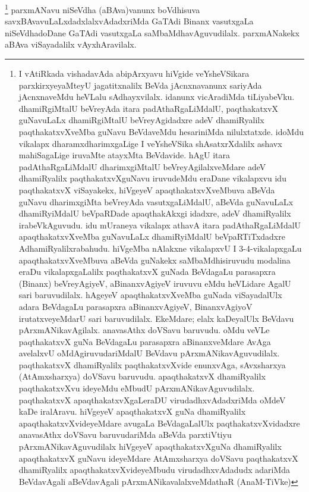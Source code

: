 \begin{artha}
\footnote{I vAtiRkada vishadavAda abipArxyavu hiVgide veYsheVSikara parxkirxyeyaMteyU jagatitxnalilx BeVda jAcnxnavanunx sariyAda jAcnxnaveMdu heVLalu sAdhayxvilalx. idanunx vicAradiMda tiLiyabeVku. dhamiRgiMtalU beVreyAda itara padAthaRgaLiMdalU, paqthakatxvX guNavuLaLx dhamiRgiMtalU beVreyAgidadxre adeV dhamiRyalilx paqthakatxvXveMba guNavu BeVdaveMdu hesariniMda nilulxtatxde. idoMdu vikalapx dharamxdharimxgaLige I veYsheVSika shAsatxrXdalilx ashavx mahiSagaLige iruvaMte atayxMta BeVdavide. hAgU itara padAthaRgaLiMdalU dharimxgiMtalU beVreyAgilalxveMdare adeV dhamiRyalilx paqthakatxvXguNavu iruvudeMdu eraDane vikalapxvu idu paqthakatxvX viSayakekx, hiVgeyeV apaqthakatxvXveMbuva aBeVda guNavu dharimxgiMta beVreyAda vasutxgaLiMdalU, aBeVda guNavuLaLx dhamiRyiMdalU beVpaRDade apaqthakAkxgi idadxre, adeV dhamiRyalilx irabeVkAguvudu. idu mUraneya vikalapx athavA itara padAthaRgaLiMdalU apaqthakatxvXveMba guNavuLaLx dhamiRyiMdalU beVpaRTiTxdadxre AdhamiRyalilxrabahudu. hiVgeMba nAlakxne vikalapxvU I 3-4-vikalapxgaLu apaqthakatxvXveMbuva aBeVda guNakekx saMbaMdhisiruvudu modalina eraDu vikalapxgaLalilx paqthakatxvX guNada BeVdagaLu parasapxra (Binanx) beVreyAgiyeV, aBinanxvAgiyeV iruvuvu eMdu heVLidare AgalU sari baruvudilalx. hAgeyeV apaqthakatxvXveMba guNada viSayadalUlx adara BeVdagaLu parasapxra aBinanxvAgiyeV, BinanxvAgiyoV irutatxveyeMdarU sari baruvudilalx. EkeMdare; elalx kaDeyalUlx BeVdavu pArxmANikavAgilalx. anavasAthx doVSavu baruvudu. oMdu veVLe paqthakatxvX guNa BeVdagaLu parasapxra aBinanxveMdare AvAga avelalxvU oMdAgiruvudariMdalU BeVdavu pArxmANikavAguvudilalx. paqthakatxvX dhamiRyalilx paqthakatxvXvide enunxvAga, sAvxsharxya (AtAmxsharxya) doVSavu baruvudu. apaqthakatxvX dhamiRyalilx paqthakatxvXvu ideyeMdu eMbudU pArxmANikavAguvudilalx. paqthakatxvX apaqthakatxvXgaLeraDU virudadhxvAdadxriMda oMdeV kaDe iralAravu. hiVgeyeV apaqthakatxvX guNa dhamiRyalilx apaqthakatxvXvideyeMdare avugaLa BeVdagaLalUlx paqthakatxvXvidadxre anavasAthx doVSavu baruvudariMda aBeVda parxtiVtiyu pArxmANikavAguvudilalx hiVgeyeV apaqthakatxvXguNa dhamiRyalilx apaqthakatxvX guNavu ideyeMdare AtAmxsharxya doVSavu paqthakatxvX dhamiRyalilx apaqthakatxvXvideyeMbudu virudadhxvAdadudx adariMda BeVdavAgali aBeVdavAgali pArxmANikavalalxveMdathaR (AnaM-TiVke)}
parxmANavu niSeVdha (aBAva)vanunx boVdhisuva savxBAvavuLaLxdadxlalxvAdadxriMda GaTAdi Binanx vasutxgaLa niSeVdhadoDane GaTAdi vasutxgaLa saMbaMdhavAguvudilalx. parxmANakekx aBAva viSayadalilx vAyxhAravilalx.
\end{artha}

